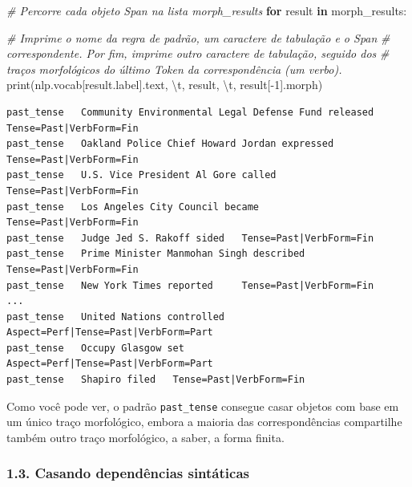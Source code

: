 \documentclass[
  brazilian,
]{article}
\newenvironment{Shaded}{}{}
\newcommand{\BuiltInTok}[1]{#1}
\newcommand{\CharTok}[1]{\textcolor[rgb]{0.25,0.44,0.63}{#1}}
\newcommand{\CommentTok}[1]{\textcolor[rgb]{0.38,0.63,0.69}{\textit{#1}}}
\newcommand{\ControlFlowTok}[1]{\textcolor[rgb]{0.00,0.44,0.13}{\textbf{#1}}}
\newcommand{\DecValTok}[1]{\textcolor[rgb]{0.25,0.63,0.44}{#1}}
\newcommand{\KeywordTok}[1]{\textcolor[rgb]{0.00,0.44,0.13}{\textbf{#1}}}
\newcommand{\NormalTok}[1]{#1}
\newcommand{\OperatorTok}[1]{\textcolor[rgb]{0.40,0.40,0.40}{#1}}
\newcommand{\StringTok}[1]{\textcolor[rgb]{0.25,0.44,0.63}{#1}}
\begin{document}
\begin{Shaded}
\begin{Highlighting}[]
\CommentTok{\# Percorre cada objeto Span na lista \textquotesingle{}morph\_results\textquotesingle{}}
\ControlFlowTok{for}\NormalTok{ result }\KeywordTok{in}\NormalTok{ morph\_results:}

    \CommentTok{\# Imprime o nome da regra de padrão, um caractere de tabulação e o Span}
    \CommentTok{\# correspondente. Por fim, imprime outro caractere de tabulação, seguido dos}
    \CommentTok{\# traços morfológicos do último Token da correspondência (um verbo).}
    \BuiltInTok{print}\NormalTok{(nlp.vocab[result.label].text, }\StringTok{\textquotesingle{}}\CharTok{\textbackslash{}t}\StringTok{\textquotesingle{}}\NormalTok{, result, }\StringTok{\textquotesingle{}}\CharTok{\textbackslash{}t}\StringTok{\textquotesingle{}}\NormalTok{, result[}\OperatorTok{{-}}\DecValTok{1}\NormalTok{].morph)}
\end{Highlighting}
\end{Shaded}

\begin{verbatim}
past_tense   Community Environmental Legal Defense Fund released     Tense=Past|VerbForm=Fin
past_tense   Oakland Police Chief Howard Jordan expressed    Tense=Past|VerbForm=Fin
past_tense   U.S. Vice President Al Gore called      Tense=Past|VerbForm=Fin
past_tense   Los Angeles City Council became     Tense=Past|VerbForm=Fin
past_tense   Judge Jed S. Rakoff sided   Tense=Past|VerbForm=Fin
past_tense   Prime Minister Manmohan Singh described     Tense=Past|VerbForm=Fin
past_tense   New York Times reported     Tense=Past|VerbForm=Fin
...
past_tense   United Nations controlled   Aspect=Perf|Tense=Past|VerbForm=Part
past_tense   Occupy Glasgow set      Aspect=Perf|Tense=Past|VerbForm=Part
past_tense   Shapiro filed   Tense=Past|VerbForm=Fin
\end{verbatim}

Como você pode ver, o padrão \texttt{past\_tense} consegue casar objetos
com base em um único traço morfológico, embora a maioria das
correspondências compartilhe também outro traço morfológico, a saber, a
forma finita.

\hypertarget{casando-dependuxeancias-sintuxe1ticas}{%
\subsubsection{1.3. Casando dependências
sintáticas}\label{casando-dependuxeancias-sintuxe1ticas}}
\end{document}

